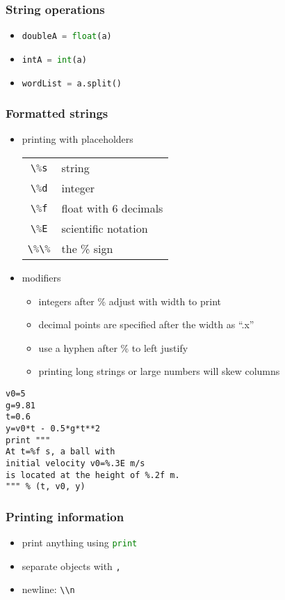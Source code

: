 \documentclass[xcolor=table,10pt,final]{beamer}
\begin{document}
\begin{frame}
  \frametitle{String operations}
  \begin{itemize}
    \item \lstinline[language=python]|doubleA = float(a)|
    \item \lstinline[language=python]|intA = int(a)|
    \item \lstinline[language=python]|wordList = a.split()|
  \end{itemize}
\end{frame}

\begin{frame}[fragile]
  \frametitle{Formatted strings}
  \begin{itemize}
    \item printing with placeholders
      \begin{table}
        \begin{tabular}{cl}
          \lstinline[language=python]|\%s| & string\\
          \lstinline[language=python]|\%d| & integer\\
          \lstinline[language=python]|\%f| & float with 6 decimals\\
          \lstinline[language=python]|\%E| & scientific notation\\
          \lstinline[language=python]|\%\%| & the \% sign
        \end{tabular}
      \end{table}
    \item modifiers
      \begin{itemize}
        \item integers after \% adjust with width to print
        \item decimal points are specified after the width as ``.x''
        \item use a hyphen after \% to left justify
        \item printing long strings or large numbers will skew columns
      \end{itemize}
  \end{itemize}
\begin{lstlisting}[langage=python]
v0=5
g=9.81
t=0.6
y=v0*t - 0.5*g*t**2
print """
At t=%f s, a ball with
initial velocity v0=%.3E m/s
is located at the height of %.2f m.
""" % (t, v0, y)
\end{lstlisting}
\end{frame}

\begin{frame}
  \frametitle{Printing information}
  \begin{itemize}
    \item print anything using \lstinline[language=python]|print|
    \item separate objects with \lstinline[language=python]|,|
    \item newline: \lstinline[language=python]|\\n|
  \end{itemize}
\end{frame}
\end{document}
